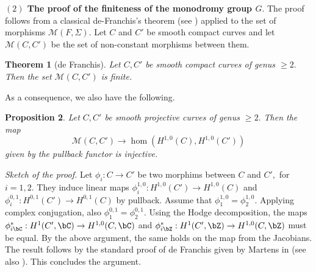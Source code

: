 \documentclass[a4paper,11pt]{amsart}
\newtheorem{theorem}{Theorem}[section]
\newtheorem{proposition}[theorem]{Proposition}
\begin{document}
{ 					{\bf$(2)$  The proof of the finiteness of the monodromy group $G.$} The proof follows from a classical de-Franchis's theorem (see \cite{Martens_Obervations_1988}) applied to the set of morphisms $\mathscr{M}(F,\Sigma).$ 
 					 Let $C$ and $C'$ be smooth compact curves and let $\mathscr{M}(C,C')$ be the set of non-constant morphisms between them. 
 					\begin{theorem}[de Franchis]\label{Teo-deFranchis} Let $C,C'$ be smooth compact curves of genus $\geq 2.$ Then the set $\mathscr{M}(C,C')$ is finite. 
 					\end{theorem}
 					As a consequence, we also have the following. 
 					\begin{proposition}Let $C,C'$ be smooth projective curves of genus $\geq 2.$ Then the map
 						\begin{equation}\label{Cor-MorHomDeFra}
 						\mathscr{M}(C,C')\to \hom(H^{1,0}(C),H^{1,0}(C'))
 						\end{equation}
 						given by the pullback functor is injective. 
 					\end{proposition}
 					
 					
 					{\em Sketch of the proof.}
 					 						Let $\phi_i:C\to C'$ be two morphims between $C$ and $C',$ for $i=1,2.$  They induce linear maps $ \phi_i^{1,0}: H^{1,0}(C')\to H^{1,0}(C)$ and $ \phi_i^{0,1}: H^{0,1}(C')\to H^{0,1}(C)$ by pullback. Assume that $\phi_1^{1,0}=\phi_2^{1,0}.$ Applying complex conjugation, also $\phi_1^{0,1}=\phi_2^{0,1}.$ Using the Hodge decomposition,  the maps $\phi_{i \bC}^\ast: H^{1}(C',\bC)\to H^{1,0}(C,\bC)$ and  $\phi_{i \bZ}^\ast: H^{1}(C',\bZ)\to H^{1,0}(C,\bZ)$ must be equal. By the above argument, the same holds on the map from the Jacobians. The result follows by the standard proof of de Franchis given by Martens in \cite{Martens_Obervations_1988} (see also \cite{AlzatiPirola_Some_1991}). This concludes the argument.
% 						
 	
}
\end{document}
